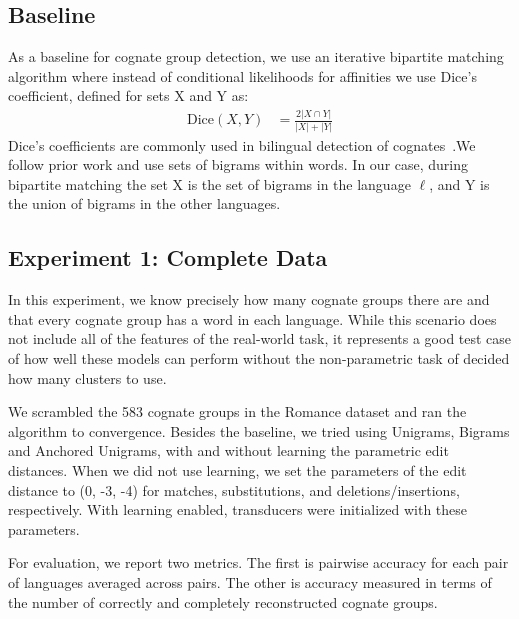 \documentclass[11pt,a4paper]{article}
\begin{document}
\subsection{Baseline}
\label{sec:baseline}

As a baseline for cognate group detection, we use an iterative
bipartite matching algorithm where instead of conditional likelihoods
for affinities we use Dice's coefficient, defined for sets X and
Y as:
\begin{equation}
  \begin{split}
    \mathrm{Dice}(X,Y) &= \frac{2 |X\cap Y|}{|X| + |Y|}
   \end{split}
 \end{equation}
Dice's coefficients are commonly used in bilingual detection of
cognates~\cite{Kondrak01identifyingcognates,Kondrak03cognatescan}.We
follow prior work and use sets of bigrams within words. In our case,
during bipartite matching the set X is the set of bigrams in the
language $\ell$, and Y is the union of bigrams in the other languages.

\subsection{Experiment 1: Complete Data}

In this experiment, we know precisely how many cognate groups there
are and that every cognate group has a word in each language. While
this scenario does not include all of the features of the real-world
task, it represents a good test case of how well these models can
perform without the non-parametric task of decided how many clusters
to use.

We scrambled the 583 cognate groups in the Romance dataset and ran
the algorithm to convergence. Besides the baseline, we tried using
Unigrams, Bigrams and Anchored Unigrams, with and without learning
the parametric edit distances. When we did not use learning, we set
the parameters of the edit distance to (0, -3, -4) for matches,
substitutions, and deletions/insertions, respectively. With learning
enabled, transducers were initialized with these parameters.

For evaluation, we report two metrics. The first is pairwise accuracy
for each pair of languages averaged across pairs. The other is
accuracy measured in terms of the number of correctly and completely
reconstructed cognate groups.
\end{document}
